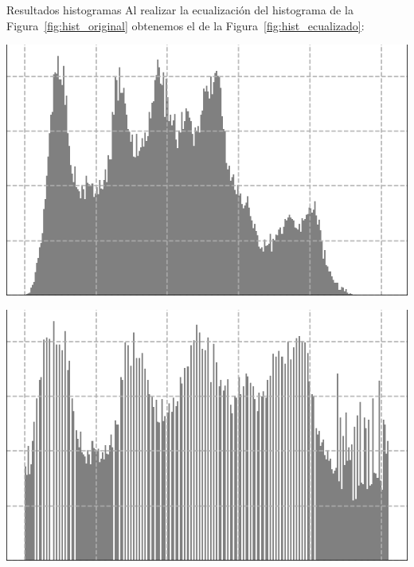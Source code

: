 \documentclass{beamer}
\begin{document}
\begin{frame}[fragile]{Resultados histogramas}
	\justifying
	Al realizar la ecualización del histograma de la Figura~\ref{fig:hist_original} obtenemos el de la Figura~\ref{fig:hist_ecualizado}:
	\vspace{0.5cm}
	
	\centering
	\begin{minipage}{0.45\linewidth}
		\centering
		\includegraphics[width=\linewidth]{../results/lena_hist_gris}
		\label{fig:hist_original}
	\end{minipage}\hfill
	\begin{minipage}{0.45\linewidth}
		\centering
		\includegraphics[width=\linewidth]{../results/lena_hist_gris_ecualizado}
		\label{fig:hist_ecualizado}
	\end{minipage}
\end{frame}
\end{document}
